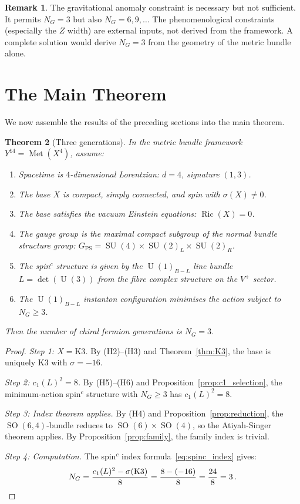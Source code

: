 \documentclass[12pt,a4paper]{article}
\newtheorem{theorem}{Theorem}[section]
\theoremstyle{definition}
\newtheorem{remark}[theorem]{Remark}
\newcommand{\Met}{\operatorname{Met}}
\newcommand{\SO}{\operatorname{SO}}
\newcommand{\SU}{\operatorname{SU}}
\newcommand{\U}{\operatorname{U}}
\begin{document}
\begin{remark}
The gravitational anomaly constraint is necessary but not sufficient.
It permits $N_G = 3$ but also $N_G = 6, 9, \ldots$
The phenomenological constraints (especially the $Z$ width) are external inputs, not derived from the framework.
A complete solution would derive $N_G = 3$ from the geometry of the metric bundle alone.
\end{remark}


\section{The Main Theorem}
\label{sec:theorem}

We now assemble the results of the preceding sections into the main theorem.

\begin{theorem}[Three generations]
\label{thm:main}
In the metric bundle framework $Y^{14} = \Met(X^4)$, assume:
\begin{enumerate}[nosep,label=\textup{(H\arabic*)}]
\item Spacetime is $4$-dimensional Lorentzian: $d = 4$, signature $(1,3)$.
\item The base $X$ is compact, simply connected, and spin with $\sigma(X) \neq 0$.
\item The base satisfies the vacuum Einstein equations: $\operatorname{Ric}(X) = 0$.
\item The gauge group is the maximal compact subgroup of the normal bundle structure group: $G_{\mathrm{PS}} = \SU(4) \times \SU(2)_L \times \SU(2)_R$.
\item The spin$^c$ structure is given by the $\U(1)_{B-L}$ line bundle $L = \det(\U(3))$ from the fibre complex structure on the $V^+$ sector.
\item The $\U(1)_{B-L}$ instanton configuration minimises the action subject to $N_G \geq 3$.
\end{enumerate}
Then the number of chiral fermion generations is $N_G = 3$.
\end{theorem}

\begin{proof}
\emph{Step 1: $X = \mathrm{K3}$.}\;
By (H2)--(H3) and Theorem~\ref{thm:K3}, the base is uniquely K3 with $\sigma = -16$.

\emph{Step 2: $c_1(L)^2 = 8$.}\;
By (H5)--(H6) and Proposition~\ref{prop:c1_selection}, the minimum-action spin$^c$ structure with $N_G \geq 3$ has $c_1(L)^2 = 8$.

\emph{Step 3: Index theorem applies.}\;
By (H4) and Proposition~\ref{prop:reduction}, the $\SO(6,4)$-bundle reduces to $\SO(6) \times \SO(4)$, so the Atiyah-Singer theorem applies.
By Proposition~\ref{prop:family}, the family index is trivial.

\emph{Step 4: Computation.}\;
The spin$^c$ index formula~\eqref{eq:spinc_index} gives:
\begin{equation}
N_G = \frac{c_1(L)^2 - \sigma(\mathrm{K3})}{8} = \frac{8 - (-16)}{8} = \frac{24}{8} = 3\,. \qedhere
\end{equation}
\end{proof}
\end{document}
